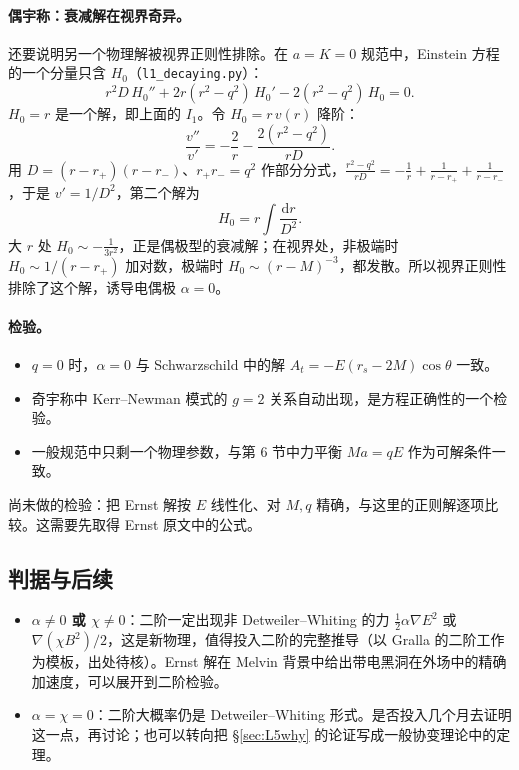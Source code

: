 \documentclass[11pt,a4paper]{ctexart}
\numberwithin{equation}{section}
\newcommand{\dd}{\mathrm d}
\begin{document}
\paragraph{偶宇称：衰减解在视界奇异。}还要说明另一个物理解被视界正则性排除。在 $a=K=0$ 规范中，Einstein 方程的一个分量只含 $H_0$（\texttt{l1\_decaying.py}）：
\begin{equation}
r^2D\,H_0''+2r(r^2-q^2)\,H_0'-2(r^2-q^2)\,H_0=0 .
\label{eq:H0ode}
\end{equation}
$H_0=r$ 是一个解，即上面的 $I_1$。令 $H_0=r\,v(r)$ 降阶：
\begin{equation*}
\frac{v''}{v'}=-\frac2r-\frac{2(r^2-q^2)}{rD}.
\end{equation*}
用 $D=(r-r_+)(r-r_-)$、$r_+r_-=q^2$ 作部分分式，$\frac{r^2-q^2}{rD}=-\frac1r+\frac1{r-r_+}+\frac1{r-r_-}$，于是 $v'=1/D^2$，第二个解为
\begin{equation*}
H_0=r\int\frac{\dd r}{D^2}.
\end{equation*}
大 $r$ 处 $H_0\sim-\tfrac1{3r^2}$，正是偶极型的衰减解；在视界处，非极端时 $H_0\sim1/(r-r_+)$ 加对数，极端时 $H_0\sim(r-M)^{-3}$，都发散。所以视界正则性排除了这个解，诱导电偶极 $\alpha=0$。

\paragraph{检验。}
\begin{itemize}
\item $q=0$ 时，$\alpha=0$ 与 Schwarzschild 中的解 $A_t=-E(r_s-2M)\cos\theta$ 一致。
\item 奇宇称中 Kerr--Newman 模式的 $g=2$ 关系自动出现，是方程正确性的一个检验。
\item 一般规范中只剩一个物理参数，与第 6 节中力平衡 $Ma=qE$ 作为可解条件一致。
\end{itemize}
尚未做的检验：把 Ernst 解按 $E$ 线性化、对 $M,q$ 精确，与这里的正则解逐项比较。这需要先取得 Ernst 原文中的公式。

\subsection{判据与后续}

\begin{itemize}
\item \textbf{$\alpha\neq0$ 或 $\chi\neq0$}：二阶一定出现非 Detweiler--Whiting 的力 $\tfrac12\alpha\nabla E^2$ 或 $\nabla(\chi B^2)/2$，这是新物理，值得投入二阶的完整推导（以 Gralla 的二阶工作为模板，出处待核）。Ernst 解在 Melvin 背景中给出带电黑洞在外场中的精确加速度，可以展开到二阶检验。
\item \textbf{$\alpha=\chi=0$}：二阶大概率仍是 Detweiler--Whiting 形式。是否投入几个月去证明这一点，再讨论；也可以转向把 \S\ref{sec:L5why} 的论证写成一般协变理论中的定理。
\end{itemize}
\end{document}
